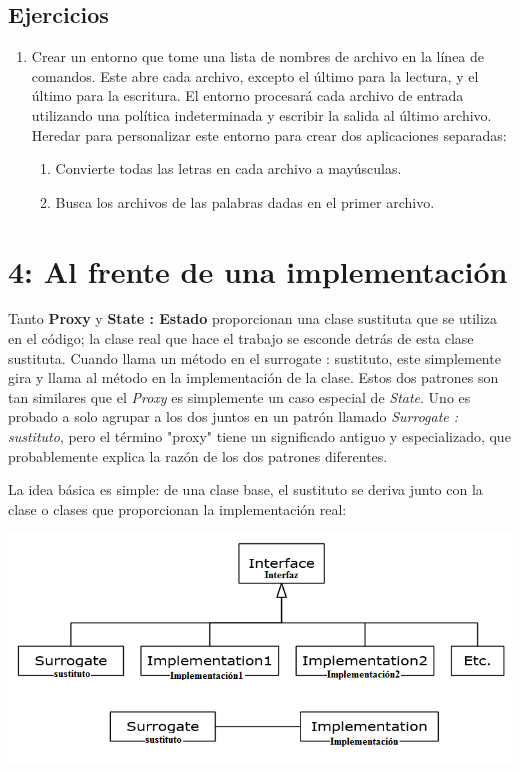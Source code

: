 \documentclass{article}
\begin{document}
\subsection{Ejercicios}
\begin{enumerate}[1.]
    \item Crear un entorno que tome una lista de nombres de archivo en la línea de comandos. Este abre cada archivo, excepto el último para la lectura, y el último para la escritura. El entorno procesará cada archivo de entrada utilizando una política indeterminada y escribir la salida al último archivo. Heredar para personalizar este entorno para crear dos aplicaciones separadas:
    \begin{enumerate}[1)]
        \item Convierte todas las letras en cada archivo a mayúsculas.
        \item Busca los archivos de las palabras dadas en el primer archivo.
    \end{enumerate}
\end{enumerate}

\section{4: Al frente de una implementación}

Tanto \textbf{Proxy} y \textbf{State : Estado} proporcionan una clase sustituta que se utiliza en el código; la clase real que hace el trabajo se esconde detrás de esta clase sustituta. Cuando llama un método en el  surrogate : sustituto, este simplemente gira y llama al método en la implementación de la clase. Estos dos patrones son tan similares que el \textit{Proxy} es simplemente un caso especial de \textit{State}. Uno es probado a solo agrupar a los dos juntos en un patrón llamado \textit{Surrogate : sustituto}, pero el término "proxy" tiene un significado antiguo y  especializado, que probablemente explica la razón de los dos patrones diferentes.    \newline

La idea básica es simple: de una clase base, el sustituto se deriva junto con la clase o clases que proporcionan la implementación real:

\includegraphics[width=\textwidth]{PaginaNo50} 
\end{document}
